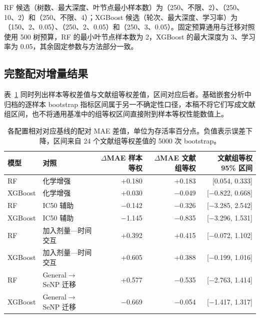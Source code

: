 \documentclass[letterpaper]{article}
\begin{document}
RF 候选（树数、最大深度、叶节点最小样本数）为（250、不限、2）、（250、10、2）和（250、不限、4）；XGBoost 候选（轮次、最大深度、学习率）为（150、2、0.05）、（250、2、0.05）和（250、3、0.05）。固定预算通用与迁移对照使用 500 树预算，RF 的最小叶节点样本数为 2，XGBoost 的最大深度为 3、学习率为 0.05，其余固定参数与方法部分一致。

\subsection{完整配对增量结果}

表~\ref{tab:paired_comparisons} 同时列出样本等权差值与文献组等权差值，区间对应后者。基础嵌套分析中归档的逐样本 bootstrap 指标区间属于另一不确定性口径，本稿不将它们写成文献组区间，也不将通用基准中的组等权区间直接附到样本等权性能数值上。

\begin{table}[H]
\centering
\caption{各配置相对对应基线的配对 MAE 差值，单位为存活率百分点。负值表示误差下降，区间来自 24 个文献组等权差值的 5000 次 bootstrap。}
\label{tab:paired_comparisons}
\small
\begin{tabularx}{\linewidth}{lXrrr}
\toprule
模型 & 对照 & \ensuremath{\Delta}MAE 样本等权 & \ensuremath{\Delta}MAE 文献组等权 & 文献组等权 95\% 区间 \\
\midrule
RF & 化学增强 & +0.180 & +0.183 & [0.054, 0.333] \\
XGBoost & 化学增强 & +0.030 & \ensuremath{\mathord{-}}0.049 & [\ensuremath{\mathord{-}}0.822, 0.668] \\
RF & IC50 辅助 & \ensuremath{\mathord{-}}0.142 & \ensuremath{\mathord{-}}0.326 & [\ensuremath{\mathord{-}}3.285, 2.542] \\
XGBoost & IC50 辅助 & \ensuremath{\mathord{-}}1.145 & \ensuremath{\mathord{-}}0.835 & [\ensuremath{\mathord{-}}3.296, 1.531] \\
RF & 加入剂量—时间交互 & +0.392 & +0.415 & [\ensuremath{\mathord{-}}0.072, 1.102] \\
XGBoost & 加入剂量—时间交互 & +0.605 & +0.388 & [\ensuremath{\mathord{-}}0.199, 1.016] \\
RF & General\ensuremath{\rightarrow}SeNP 迁移 & +0.577 & \ensuremath{\mathord{-}}0.535 & [\ensuremath{\mathord{-}}2.763, 1.414] \\
XGBoost & General\ensuremath{\rightarrow}SeNP 迁移 & \ensuremath{\mathord{-}}0.669 & \ensuremath{\mathord{-}}0.054 & [\ensuremath{\mathord{-}}1.417, 1.317] \\
\bottomrule
\end{tabularx}

\end{table}
\end{document}
